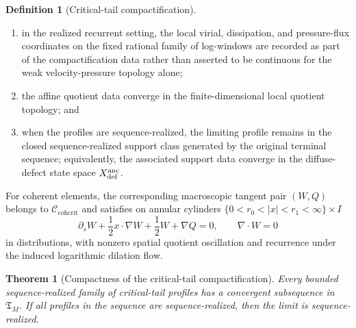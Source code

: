 \documentclass[11pt]{amsart}
\numberwithin{equation}{section}
\theoremstyle{plain}
\newtheorem{theorem}{Theorem}[section]
\theoremstyle{definition}
\newtheorem{definition}[definition]{Definition}
\theoremstyle{remark}
\newcommand{\Ccohcrit}{\mathcal C_{\mathrm{cohcrit}}}
\newcommand{\Tcrit}{\mathfrak T_M}
\begin{document}
\begin{definition}[Critical-tail compactification]
\begin{enumerate}[label=\textup{(\roman*)}]
    the scalar defect
   coordinates \(\mathscr P_{n,F}[\psi]\) and \(\mathscr D_{n,F}[\psi]\)
   converge;
   \item in the realized recurrent setting, the local virial, dissipation, and
   pressure-flux coordinates on the fixed rational family of log-windows are
   recorded as part of the compactification data rather than asserted to be
   continuous for the weak velocity-pressure topology alone;
   \item the affine quotient data converge in the finite-dimensional local
   quotient topology; and
   \item when the profiles are sequence-realized, the limiting profile remains in
   the closed sequence-realized support class generated by the original terminal
   sequence; equivalently, the associated support data converge in the
   diffuse-defect state space \(X_{\rm def}^{\rm anc}\).
\end{enumerate}

For coherent elements, the corresponding macroscopic tangent pair \((W,Q)\)
belongs to \(\Ccohcrit\) and satisfies on annular cylinders
\(\{0<r_0<|x|<r_1<\infty\}\times I\)
\[
   \partial_s W+\frac12 x\cdot\nabla W+\frac12W+\nabla Q=0,
   \qquad
   \nabla\cdot W=0
\]
in distributions, with nonzero spatial quotient oscillation and
recurrence under the induced logarithmic dilation flow.
\end{definition}

\begin{theorem}[Compactness of the critical-tail compactification]
\label{thm:critical-tail-compactification-compactness}
Every bounded sequence-realized family of critical-tail profiles has a convergent
subsequence in \(\Tcrit\).  If all profiles in the sequence are sequence-realized,
then the limit is sequence-realized.
\end{theorem}
\end{document}
